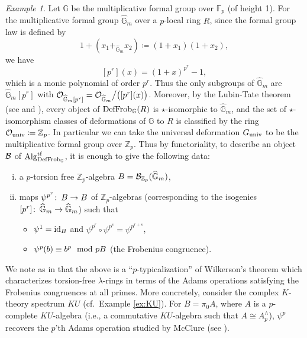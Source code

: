 \documentclass{gtpart}
\theoremstyle{definition}
\theoremstyle{remark}
\newtheorem{ex}[thm]{Example}
\def\co{\colon\thinspace}
\newcommand{\mb}[1]{\mathbb{#1}}
\newcommand{\CB}{{\cal B}}
\newcommand{\CO}{{\cal O}}
\newcommand{\Alg}{{\rm Alg}}
\newcommand{\DF}{{{\rm DefFrob}_\BG}}
\newcommand{\HGm}{{\widehat{\mb G}_m}}
\newcommand{\BF}{{\mb F}}
\newcommand{\BG}{{\mb G}}
\newcommand{\BZ}{{\mb Z}}
\newcommand{\md}{~~{\rm mod}~}
\newcommand{\id}{{\rm id}}
\newcommand{\tf}{{\rm tf}}
\newcommand{\univ}{{\rm univ}}
\newcommand{\ce}{\coloneqq}
\numberwithin{equation}{section}
\numberwithin{thm}{section}
\begin{document}
\begin{ex}
\label{ex:K_p}
 Let $\BG$ be the multiplicative formal group over $\BF_p$ (of height 1).  
 For the multiplicative formal group $\HGm$ over a $p$-local ring $R$, 
 since the formal group law is defined by 
 \[
  1 + (x_1 +_\HGm x_2) \ce (1 + x_1)(1 + x_2), 
 \]
 we have 
 \[
  [p^r](x) = (1 + x)^{p^r} - 1, 
 \]
 which is a monic polynomial of order $p^r$.  Thus the only subgroups of 
 $\HGm$ are $\HGm [p^r]$ with 
 $\CO_{\HGm [p^r]} = \CO_\HGm \big/ \big( [p^r](x) \big)$.  Moreover, by 
 the Lubin-Tate theorem (see \cite[Theorem 3.1]{lubintate} and 
 \cite[Section 4.3]{Rnotes}), every object of $\DF(R)$ is 
 $\star$-isomorphic to $\HGm$, and the set of $\star$-isomorphism 
 classes of deformations of $\BG$ to $R$ is classified by the ring 
 $\CO_\univ \ce \BZ_p$.  In particular we can take the universal 
 deformation $G_\univ$ to be the multiplicative formal group over 
 $\BZ_p$.  Thus by functoriality, to describe an object $\CB$ of 
 $\Alg_\DF^\tf$, it is enough to give the following data: 
 \begin{enumerate}[(i)]
  \item a $p$-torsion free $\BZ_p$-algebra $B = \CB_{\BZ_p}(\HGm)$, 

  \item maps $\psi^{p^r} \co B \to B$ of $\BZ_p$-algebras (corresponding 
  to the isogenies $[p^r] \co \HGm \to \HGm$) such that 
  \begin{itemize}
   \item $\psi^1 = \id_B$ and 
   $\psi^{p^r} \circ \psi^{p^s} = \psi^{p^{r+s}}$, 

   \item $\psi^p(b) \equiv b^p \md pB$ (the Frobenius congruence).  
  \end{itemize}
 \end{enumerate}

 We note as in \cite[Example 1.3]{cong} that the above is a 
 ``$p$-typicalization'' of Wilkerson's theorem 
 \cite[Proposition 1.2]{wilkerson} which characterizes torsion-free 
 $\lambda$-rings in terms of the Adams operations satisfying the 
 Frobenius congruences at all primes.  More concretely, consider the 
 complex $K$-theory spectrum $KU$ (cf.~Example \ref{ex:KU}).  For 
 $B = \pi_0 A$, where $A$ is a $p$-complete $KU$-algebra (i.e., a 
 commutative $KU$-algebra such that $A \cong A_p^\wedge$), $\psi^p$ 
 recovers the $p$'th Adams operation studied by McClure (see 
 \cite[Chapters VIII and IX]{H_infty}).  
\end{ex}
\end{document}
